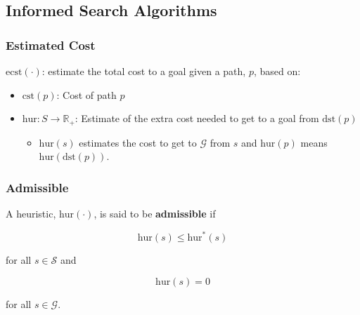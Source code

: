 \subsection{Informed Search Algorithms}
\subsubsection{Estimated Cost}
\begin{definition}
    $\text{ecst}(\cdot)$: estimate the total cost to a goal given a path, $p$, based on:
    \begin{itemize}
        \item $\text{cst}(p)$: Cost of path $p$
        \item $\text{hur}: S \to \mathbb{R}_+$: Estimate of the extra cost needed to get to a goal from $\text{dst}(p)$
        \begin{itemize}
            \item $\text{hur}(s)$ estimates the cost to get to $\mathcal{G}$ from $s$ and $\text{hur}(p)$ means $\text{hur}(\text{dst}(p))$.
        \end{itemize}
    \end{itemize}
\end{definition}

\subsubsection{Admissible}
\begin{definition}
    A heuristic, $\text{hur}(\cdot)$, is said to be \textbf{admissible} if

    \begin{equation*}
        \text{hur}(s) \leq \text{hur}^*(s)
    \end{equation*}

    for all $s \in \mathcal{S}$ and

    \begin{equation*}
        \text{hur}(s) = 0
    \end{equation*}

    for all $s \in \mathcal{G}$.
\end{definition}

